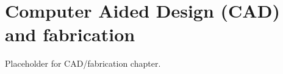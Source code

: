 \setchapterpreamble[u]{\margintoc}
\chapter{Computer Aided Design (CAD) and fabrication}

Placeholder for CAD/fabrication chapter.